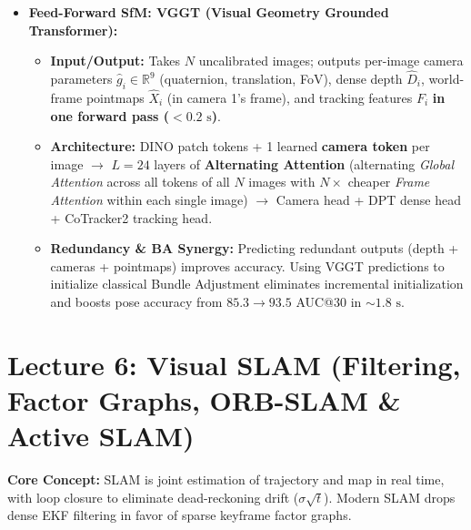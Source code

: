 \documentclass[11pt,a4paper]{article}
\theoremstyle{definition}
\theoremstyle{plain}
\theoremstyle{remark}
\begin{document}
\begin{itemize}
\begin{itemize}
        \item \textbf{Incremental SfM Loop:} Seed with a wide-baseline two-view reconstruction $\rightarrow$ register next image via \textbf{PnP / P3P} (2D-to-3D matches) $\rightarrow$ triangulate new points $\rightarrow$ run local BA (and periodic global BA) + filter outliers. \textbf{Flaw:} Slow, sequential error accumulation/drift, fails on low overlap or textureless scenes. (GLOMAP is a non-learned global alternative).
    \end{itemize}
    \item \textbf{Feed-Forward SfM: VGGT (Visual Geometry Grounded Transformer):}
    \begin{itemize}
        \item \textbf{Input/Output:} Takes $N$ uncalibrated images; outputs per-image camera parameters $\hat{g}_i \in \mathbb{R}^9$ (quaternion, translation, FoV), dense depth $\hat{D}_i$, world-frame pointmaps $\hat{X}_i$ (in camera 1's frame), and tracking features $F_i$ \textbf{in one forward pass ($<0.2\text{ s}$)}.
        \item \textbf{Architecture:} DINO patch tokens + 1 learned \textbf{camera token} per image $\rightarrow$ $L=24$ layers of \textbf{Alternating Attention} (alternating \emph{Global Attention} across all tokens of all $N$ images with $N\times$ cheaper \emph{Frame Attention} within each single image) $\rightarrow$ Camera head + DPT dense head + CoTracker2 tracking head.
        \item \textbf{Redundancy \& BA Synergy:} Predicting redundant outputs (depth + cameras + pointmaps) improves accuracy. Using VGGT predictions to initialize classical Bundle Adjustment eliminates incremental initialization and boosts pose accuracy from $85.3 \to 93.5$ AUC@30 in $\sim 1.8\text{ s}$.
    \end{itemize}
\end{itemize}

\hr
\section*{\textcolor{primary}{Lecture 6: Visual SLAM (Filtering, Factor Graphs, ORB-SLAM \& Active SLAM)}}
\textbf{Core Concept:} SLAM is joint estimation of trajectory and map in real time, with loop closure to eliminate dead-reckoning drift ($\sigma\sqrt{t}$). Modern SLAM drops dense EKF filtering in favor of sparse keyframe factor graphs.
\end{document}
